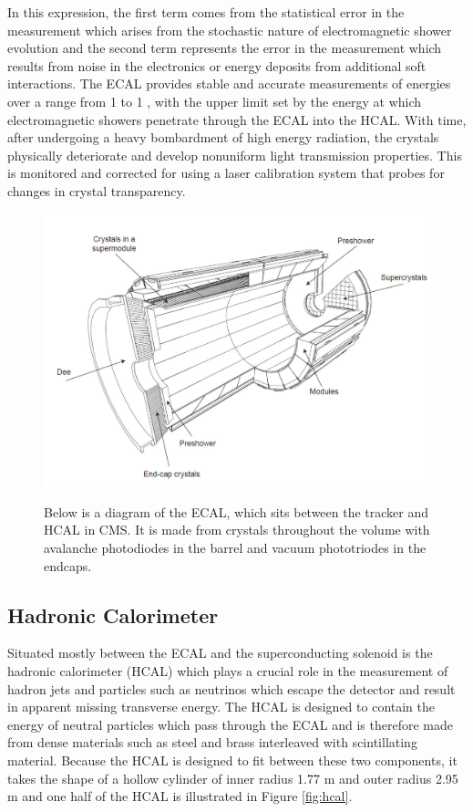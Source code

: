 In this expression, the first term comes from the statistical error 
 in the measurement which arises
 from the stochastic nature of electromagnetic shower evolution
 and the second term represents the error in the measurement
 which results from noise in the electronics or
 energy deposits from additional soft interactions.
The ECAL provides stable and accurate
 measurements of energies over a range from 1 \GeV to 1 \TeV, 
 with the upper limit set by the energy at which electromagnetic showers
 penetrate through the ECAL into the HCAL.
With time, after undergoing a heavy bombardment of high energy radiation,
 the \pbw crystals physically deteriorate and develop 
 nonuniform light transmission properties.
This is monitored and corrected for using a laser calibration system
 that probes for changes in crystal transparency.

\begin{figure}[tb]
\caption[The CMS Electromagnetic Calorimeter]{
 Below is a diagram of the ECAL, 
  which sits between the tracker and HCAL in CMS.
 It is made from \pbw crystals throughout the volume
  with avalanche photodiodes in the barrel
  and vacuum phototriodes in the endcaps.
 }
\includegraphics[width=\textwidth]{pdfs/experiment/cms_ecal.pdf}
\label{fig:ecal}
\end{figure}
 

 \subsection{Hadronic Calorimeter}
Situated mostly between the ECAL and the superconducting solenoid
 is the hadronic calorimeter (HCAL) which plays a
 crucial role in the measurement of hadron jets
 and particles such as neutrinos which escape the detector
 and result in apparent missing transverse energy.
The HCAL is designed to contain the energy of neutral
 particles which pass through the ECAL and is therefore made
 from dense materials such as 
 steel and brass interleaved with scintillating material.
Because the HCAL is designed to fit between these
 two components, it takes the shape of a hollow
 cylinder of inner radius 1.77 m and outer radius 2.95 m
 and one half of the HCAL is illustrated in Figure \ref{fig:hcal}.

